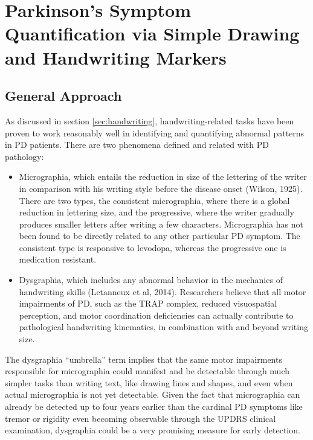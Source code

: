 \chapter{Parkinson's Symptom Quantification via Simple Drawing and Handwriting Markers}
\label{ch:handwriting}
\pagestyle{fancy}
\fancyhf{}
\fancyhead[OC]{\leftmark}
\fancyhead[EC]{\rightmark}
\cfoot{\thepage}

\section{General Approach}
\label{sec:PenGenApproach}
As discussed in section \ref{sec:handwriting}, handwriting-related tasks have been proven to work reasonably well in identifying and quantifying abnormal patterns in \gls{PD} patients. There are two phenomena defined and related with \gls{PD} pathology:

\begin{itemize}
\item Micrographia, which entails the reduction in size of the lettering of the writer in comparison with his writing style before the disease onset (Wilson, 1925). There are two types, the consistent micrographia, where there is a global reduction in lettering size, and the progressive, where the writer gradually produces smaller letters after writing a few characters. Micrographia has not been found to be directly related to any other particular \gls{PD} symptom. The consistent type is responsive to levodopa, whereas the progressive one is medication resistant. 
\item Dysgraphia, which includes any abnormal behavior in the mechanics of handwriting skills (Letanneux et al, 2014). Researchers believe that all motor impairments of \gls{PD}, such as the \gls{TRAP} complex, reduced visuospatial perception, and motor coordination deficiencies can actually contribute to pathological handwriting kinematics, in combination with and beyond writing size. 
\end{itemize}

\noindent
The dysgraphia ``umbrella'' term implies that the same motor impairments responsible for micrographia could manifest and be detectable through much simpler tasks than writing text, like drawing lines and shapes, and even when actual micrographia is not yet detectable. Given the fact that micrographia can already be detected up to four years earlier than the cardinal \gls{PD} symptoms like tremor or rigidity even becoming observable through the \gls{UPDRS} clinical examination, dysgraphia could be a very promising measure for early detection. 

